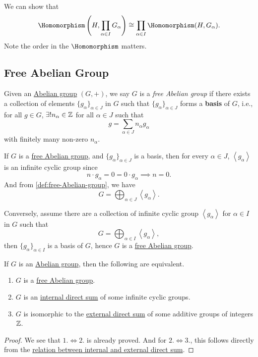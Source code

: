 \begin{exercise}
	We can show that
	\[
		\Homomorphism \left(H, \prod\limits_{\alpha \in I}G_\alpha\right) \cong \prod\limits_{\alpha \in I}\Homomorphism (H, G_\alpha).
	\]
	Note the order in the \(\Homomorphism \) matters.
\end{exercise}

\subsection{Free Abelian Group}
\begin{definition}\label{def:free-Abelian-group}
	Given an  \hyperref[def:Abelian-group]{Abelian group} \((G, +)\), we say \(G\) is a \emph{free Abelian group} if there exists a collection of elements \(\{g_\alpha \}_{\alpha \in J}\) in \(G\) such that
	\(\{g_\alpha \}_{\alpha \in J}\) forms a \textbf{basis} of \(G\), i.e., for all \(g\in G\), \(\exists ! n _\alpha \in \mathbb{\MakeUppercase{z}} \) for all \(\alpha \in J\) such that
	\[
		g = \sum\limits_{\alpha \in J} n_\alpha g_\alpha
	\]
	with finitely many non-zero \(n_\alpha\).
\end{definition}
\begin{remark}
	If \(G\) is a \hyperref[def:free-Abelian-group]{free Abelian group}, and \(\{g_\alpha \}_{\alpha \in J}\) is a basis, then for every \(\alpha \in J\), \(\left< g_\alpha \right> \) is an
	infinite cyclic group since
	\[
		n\cdot g_\alpha = 0 = 0\cdot g_\alpha \implies n = 0.
	\]
	And from \autoref{def:free-Abelian-group}, we have
	\[
		G = \bigoplus_{\alpha \in J}\left< g_\alpha  \right>.
	\]

	Conversely, assume there are a collection of infinite cyclic group \(\left< g_\alpha  \right> \) for \(\alpha \in I\) in \(G\) such that
	\[
		G = \bigoplus_{\alpha \in I}\left< g_\alpha  \right>,
	\]
	then \(\{g_\alpha \}_{\alpha \in I}\) is a basis of \(G\), hence \(G\) is a \hyperref[def:free-Abelian-group]{free Abelian group}.
\end{remark}

\begin{proposition}
	If \(G\) is an  \hyperref[def:Abelian-group]{Abelian group}, then the following are equivalent.
	\begin{enumerate}
		\item \(G\) is a \hyperref[def:free-Abelian-group]{free Abelian group}.
		\item \(G\) is an \hyperref[def:internal-direct-sum]{internal direct sum} of some infinite cyclic groups.
		\item \(G\) is isomorphic to the \hyperref[def:external-direct-sum]{external direct sum} of some additive groups of integers \(\mathbb{\MakeUppercase{z}} \).
	\end{enumerate}
\end{proposition}
\begin{proof}
	We see that \(1. \iff 2.\) is already proved. And for \(2. \iff 3.\), this follows directly from the \hyperref[rmk:relation-between-internal-and-externam-direct-sum]{relation between internal and external direct sum}.
\end{proof}


